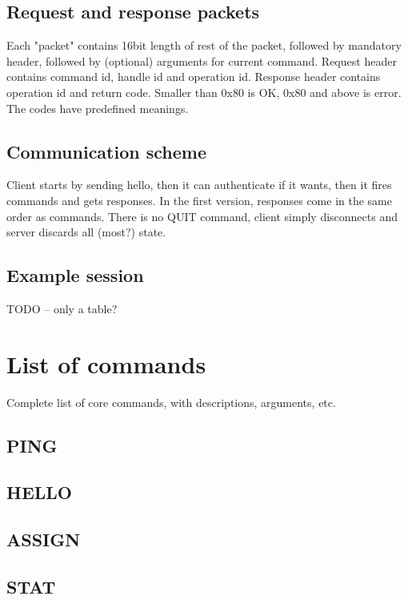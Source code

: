 \subsection{Request and response packets}

Each "packet" contains 16bit length of rest of the packet, followed by mandatory header, followed by
(optional) arguments for current command. Request header contains command id, handle id and operation id.
Response header contains operation id and return code. Smaller than 0x80 is OK, 0x80 and above is error. The
codes have predefined meanings.

\subsection{Communication scheme}

Client starts by sending hello, then it can authenticate if it wants, then it fires commands and gets
responses. In the first version, responses come in the same order as commands. There is no QUIT command,
client simply disconnects and server discards all (most?) state.

\subsection{Example session}

TODO -- only a table?


\section{List of commands}

Complete list of core commands, with descriptions, arguments, etc.

\subsection{PING}

\subsection{HELLO}

\subsection{ASSIGN}

\subsection{STAT}

